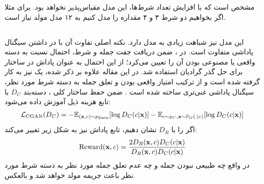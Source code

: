 مشخص است که با افزایش تعداد شرط‌ها، این مدل مقیاس‌پذیر نخواهد بود. برای مثلا اگر بخواهیم دو شرط ۳ و ۴ مقداره را مدل کنیم به ۱۲ مدل مولد نیاز است.
\subsection{}
این مدل نیز شباهت زیادی به مدل \cgan{} دارد. نکته اصلی تفاوت آن با \cgan{} در داشتن سیگنال پاداشی متفاوت است. در \cgan{}،
\discriminator{}
ضمن دریافت جفت جمله و شرط، احتمال نسبت به دسته واقعی یا مصنوعی بودن آن را تعیین می‌کرد؛ از این احتمال به عنوان پاداش در ساختار \reinforce{} برای حل گذر گرادیان استفاده شد. در این مقاله علاوه بر \discriminator{} ذکر شده، یک \classifier{} نیز به کار گرفته شده است و از ترکیب امتیاز واقعی بودن و تعلق جمله به دسته شرط مورد نظر، سیگنال پاداشی غنی‌تری ساخته شده است \cite{csgan}. ضمن حفظ ساختار کلی \cgan{}، دسته‌بند $D_C$ با تابع هزینه ذیل آموزش داده می‌شود:
\begin{align}
	{\mathcal{L}}_\text{CGAN} (D_C) =
	-\mathbb E_{({\bf x}, c) \sim p_\text{Data}} [\log D_C(c|{\bf x})]
	-\mathbb E_{c \sim p_C, {\bf x} \sim \mathbb P_G(.|c)} [\log D_C(c|{\bf x})]
\end{align}
اگر \discriminator{} را با $D_R$ نشان دهیم، تابع پاداش نیز به شکل زیر تغییر می‌کند:
\begin{align}
	\text{Reward} ({\bf x}, c) =
	\frac{2 D_R({\bf x},c)D_C(c|{\bf x})}
	{D_R({\bf x},c)D_C(c|{\bf x})}
\end{align}
در واقع چه طبیعی نبودن جمله و چه عدم تعلق جمله مورد نظر به دسته شرط مورد نظر باعث جریمه مولد خواهد شد و بالعکس.
